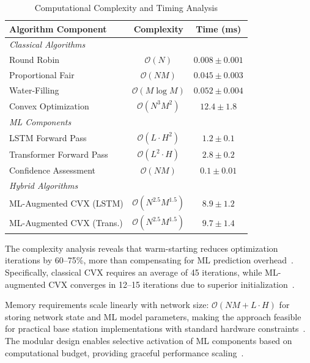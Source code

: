 \documentclass[conference]{IEEEtran}
\begin{document}
\begin{table}[h]
\centering
\caption{Computational Complexity and Timing Analysis}
\label{tab:complexity_analysis}
\begin{tabular}{@{}lcc@{}}
\toprule
\textbf{Algorithm Component} & \textbf{Complexity} & \textbf{Time (ms)} \\
\midrule
\multicolumn{3}{l}{\textit{Classical Algorithms}} \\
Round Robin & $\mathcal{O}(N)$ & $0.008 \pm 0.001$ \\
Proportional Fair & $\mathcal{O}(NM)$ & $0.045 \pm 0.003$ \\
Water-Filling & $\mathcal{O}(M \log M)$ & $0.052 \pm 0.004$ \\
Convex Optimization & $\mathcal{O}(N^3M^2)$ & $12.4 \pm 1.8$ \\
\midrule
\multicolumn{3}{l}{\textit{ML Components}} \\
LSTM Forward Pass & $\mathcal{O}(L \cdot H^2)$ & $1.2 \pm 0.1$ \\
Transformer Forward Pass & $\mathcal{O}(L^2 \cdot H)$ & $2.8 \pm 0.2$ \\
Confidence Assessment & $\mathcal{O}(NM)$ & $0.1 \pm 0.01$ \\
\midrule
\multicolumn{3}{l}{\textit{Hybrid Algorithms}} \\
ML-Augmented CVX (LSTM) & $\mathcal{O}(N^{2.5}M^{1.5})$ & $8.9 \pm 1.2$ \\
ML-Augmented CVX (Trans.) & $\mathcal{O}(N^{2.5}M^{1.5})$ & $9.7 \pm 1.4$ \\
\bottomrule
\end{tabular}
\end{table}

The complexity analysis reveals that warm-starting reduces optimization iterations by 60--75\%, more than compensating for ML prediction overhead~\cite{warm_start_optimization}. Specifically, classical CVX requires an average of 45 iterations, while ML-augmented CVX converges in 12--15 iterations due to superior initialization~\cite{boyd_convex}.

Memory requirements scale linearly with network size: $\mathcal{O}(NM + L \cdot H)$ for storing network state and ML model parameters, making the approach feasible for practical base station implementations with standard hardware constraints~\cite{realtime_systems}. The modular design enables selective activation of ML components based on computational budget, providing graceful performance scaling~\cite{adaptive_algorithms}.
\end{document}
